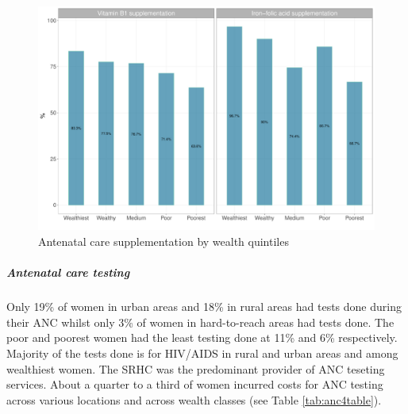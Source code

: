 \documentclass[12pt,a4paper]{article}
\let\oldsubparagraph\subparagraph
\renewcommand{\subparagraph}[1]{\oldsubparagraph{#1}\mbox{}}
\begin{document}
\begin{figure}[H]

{\centering \includegraphics{kayinReport_files/figure-latex/anc4Plot-1} 

}

\caption{Antenatal care supplementation by wealth quintiles}\label{fig:anc4Plot}
\end{figure}

\hypertarget{ancTesting}{%
\subparagraph{Antenatal care testing}\label{ancTesting}}

Only 19\% of women in urban areas and 18\% in rural areas had tests done during their ANC whilst only 3\% of women in hard-to-reach areas had tests done. The poor and poorest women had the least testing done at 11\% and 6\% respectively. Majority of the tests done is for HIV/AIDS in rural and urban areas and among wealthiest women. The SRHC was the predominant provider of ANC teseting services. About a quarter to a third of women incurred costs for ANC testing across various locations and across wealth classes (see Table \ref{tab:anc4table}).
\end{document}
